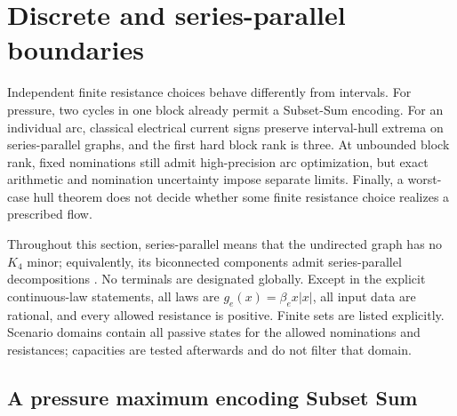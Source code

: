 \section{Discrete and series-parallel boundaries}
\label{sec:a-boundaries}

Independent finite resistance choices behave differently from intervals.
For pressure, two cycles in one block already permit a Subset-Sum
encoding. For an individual arc, classical electrical current signs
preserve interval-hull extrema on series-parallel graphs, and the first
hard block rank is three. At unbounded block rank, fixed nominations
still admit high-precision arc optimization, but exact arithmetic and
nomination uncertainty impose separate limits. Finally, a worst-case
hull theorem does not decide whether some finite resistance choice
realizes a prescribed flow.

Throughout this section, series-parallel means that the undirected graph
has no $K_4$ minor; equivalently, its biconnected components admit
series-parallel decompositions
\citep{cosmellopez2017-k4}. No terminals are designated globally. Except in the
explicit continuous-law statements, all laws are $g_e(x)=\beta_e x|x|$,
all input data are rational, and every allowed resistance is positive.
Finite sets are listed explicitly. Scenario domains contain all passive
states for the allowed nominations and resistances; capacities are
tested afterwards and do not filter that domain.

\subsection{A pressure maximum encoding Subset Sum}
\label{subsec:a-bound-pressure}

